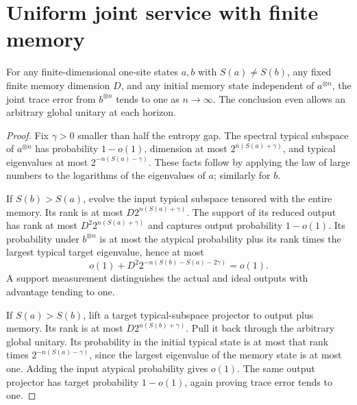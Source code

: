 \section{Uniform joint service with finite memory}\label{app:finite}

\begin{proposition}\label{prop:entropy-density}
For any finite-dimensional one-site states $a,b$ with $S(a)\ne S(b)$, any fixed finite memory dimension $D$, and any initial memory state independent of $a^{\otimes n}$, the joint trace error from $b^{\otimes n}$ tends to one as $n\to\infty$. The conclusion even allows an arbitrary global unitary at each horizon.
\end{proposition}
\begin{proof}
Fix $\gamma>0$ smaller than half the entropy gap. The spectral typical subspace of $a^{\otimes n}$ has probability $1-o(1)$, dimension at most $2^{n(S(a)+\gamma)}$, and typical eigenvalues at most $2^{-n(S(a)-\gamma)}$. These facts follow by applying the law of large numbers to the logarithms of the eigenvalues of $a$; similarly for $b$.

If $S(b)>S(a)$, evolve the input typical subspace tensored with the entire memory. Its rank is at most $D2^{n(S(a)+\gamma)}$. The support of its reduced output has rank at most $D^2 2^{n(S(a)+\gamma)}$ and captures output probability $1-o(1)$. Its probability under $b^{\otimes n}$ is at most the atypical probability plus its rank times the largest typical target eigenvalue, hence at most
\[
 o(1)+D^2 2^{-n(S(b)-S(a)-2\gamma)}=o(1).
\]
A support measurement distinguishes the actual and ideal outputs with advantage tending to one.

If $S(a)>S(b)$, lift a target typical-subspace projector to output plus memory. Its rank is at most $D2^{n(S(b)+\gamma)}$. Pull it back through the arbitrary global unitary. Its probability in the initial typical state is at most that rank times $2^{-n(S(a)-\gamma)}$, since the largest eigenvalue of the memory state is at most one. Adding the input atypical probability gives $o(1)$. The same output projector has target probability $1-o(1)$, again proving trace error tends to one.
\end{proof}


